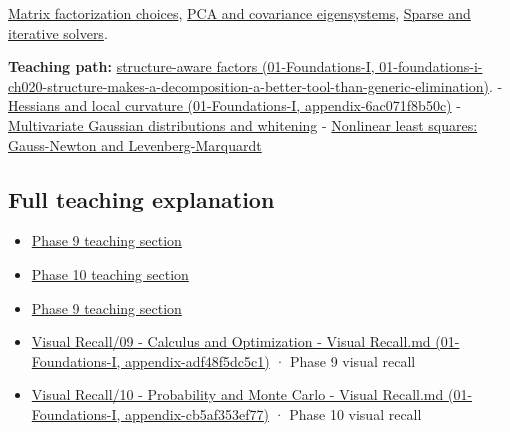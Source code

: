 \hyperref[appendix-221a483bec2d]{Matrix factorization choices}, \hyperref[appendix-ad175ef3c5bf]{PCA and covariance eigensystems}, \hyperref[appendix-67c87a3d9e94]{Sparse and iterative solvers}.

\textbf{Teaching path:} \href{../01-Foundations-I/main.pdf\#nameddest=01-foundations-i-ch020-structure-makes-a-decomposition-a-better-tool-than-generic-elimination}{structure-aware factors (01-Foundations-I, 01-foundations-i-ch020-structure-makes-a-decomposition-a-better-tool-than-generic-elimination)}. - \href{../01-Foundations-I/main.pdf\#nameddest=appendix-6ac071f8b50c}{Hessians and local curvature (01-Foundations-I, appendix-6ac071f8b50c)} - \hyperref[appendix-12bbe185dbe5]{Multivariate Gaussian distributions and whitening} - \hyperref[appendix-2c2df8345991]{Nonlinear least squares: Gauss-Newton and Levenberg-Marquardt}

\subsection{Full teaching explanation}\label{appendix-50d2ea3c9b26-full-teaching-explanation}

\begin{itemize}
\tightlist
\item
  \hyperref[02-foundations-ii-ch021-jacobians-curvature-and-local-approximation]{Phase 9 teaching section}
\item
  \hyperref[02-foundations-ii-ch024-waiting-times-event-counts-and-covariance-geometry]{Phase 10 teaching section}
\item
  \hyperref[02-foundations-ii-ch026-optimization-and-inverse-problems]{Phase 9 teaching section}
\item
  \href{../01-Foundations-I/main.pdf\#nameddest=appendix-adf48f5dc5c1}{Visual Recall/09 - Calculus and Optimization - Visual Recall.md (01-Foundations-I, appendix-adf48f5dc5c1)} · Phase 9 visual recall
\item
  \href{../01-Foundations-I/main.pdf\#nameddest=appendix-cb5af353ef77}{Visual Recall/10 - Probability and Monte Carlo - Visual Recall.md (01-Foundations-I, appendix-cb5af353ef77)} · Phase 10 visual recall
\end{itemize}
